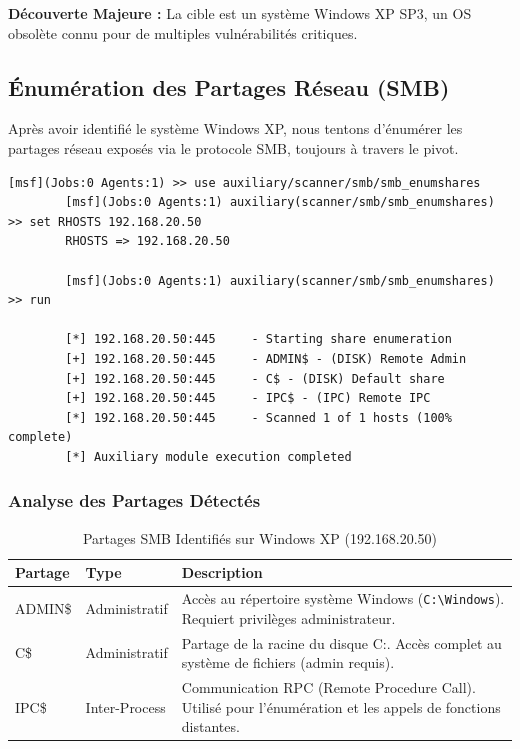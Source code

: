 \documentclass[12pt,a4paper,openany]{report}
\newcommand{\tableheadcolor}{\rowcolor{tableheadbg}}
\begin{document}
	\textbf{Découverte Majeure :} La cible est un système Windows XP SP3, un OS obsolète connu pour de multiples vulnérabilités critiques.
	
	
	\subsection{Énumération des Partages Réseau (SMB)}
	
	Après avoir identifié le système Windows XP, nous tentons d'énumérer les 
	partages réseau exposés via le protocole SMB, toujours à travers le pivot.
	
	\begin{lstlisting}[caption=Énumération Partages SMB via Metasploit]
		[msf](Jobs:0 Agents:1) >> use auxiliary/scanner/smb/smb_enumshares
		[msf](Jobs:0 Agents:1) auxiliary(scanner/smb/smb_enumshares) >> set RHOSTS 192.168.20.50
		RHOSTS => 192.168.20.50
		
		[msf](Jobs:0 Agents:1) auxiliary(scanner/smb/smb_enumshares) >> run
		
		[*] 192.168.20.50:445     - Starting share enumeration
		[+] 192.168.20.50:445     - ADMIN$ - (DISK) Remote Admin
		[+] 192.168.20.50:445     - C$ - (DISK) Default share
		[+] 192.168.20.50:445     - IPC$ - (IPC) Remote IPC
		[*] 192.168.20.50:445     - Scanned 1 of 1 hosts (100% complete)
		[*] Auxiliary module execution completed
	\end{lstlisting}
	
	\subsubsection{Analyse des Partages Détectés}
	
	\begin{table}[H]
		\centering
		\renewcommand{\arraystretch}{1.4}
		\setlength{\arrayrulewidth}{0.5pt}
		\begin{tabular}{>{\ttfamily}p{2.5cm} p{2.5cm} p{7.5cm}}
			\arrayrulecolor{tableborder}
			\hline
			\tableheadcolor
			\textcolor{tableheadfg}{\textbf{Partage}} &
			\textcolor{tableheadfg}{\textbf{Type}} &
			\textcolor{tableheadfg}{\textbf{Description}} \\
			\hline
			\rowcolor{tablerowalt}
			ADMIN\$ & Administratif & Accès au répertoire système Windows (\texttt{C:\textbackslash Windows}). Requiert privilèges administrateur. \\
			
			C\$ & Administratif & Partage de la racine du disque C:. Accès complet au système de fichiers (admin requis). \\
			
			\rowcolor{tablerowalt}
			IPC\$ & Inter-Process & Communication RPC (Remote Procedure Call). Utilisé pour l'énumération et les appels de fonctions distantes. \\
			\hline
		\end{tabular}
		\caption{Partages SMB Identifiés sur Windows XP (192.168.20.50)}
	\end{table}
	
\end{document}
